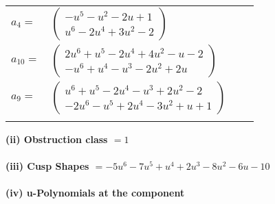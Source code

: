 \documentclass[1p]{elsarticle_modified}
\theoremstyle{definition}
\begin{document}
\begin{tabular}{m{7pt} m{180pt} m{7pt} m{180pt} }
\flushright $a_{4}=$&$\begin{pmatrix}- u^5- u^2-2 u+1\\u^6-2 u^4+3 u^2-2\end{pmatrix}$ \\
\flushright $a_{10}=$&$\begin{pmatrix}2 u^6+u^5-2 u^4+4 u^2- u-2\\- u^6+u^4- u^3-2 u^2+2 u\end{pmatrix}$ \\
\flushright $a_{9}=$&$\begin{pmatrix}u^6+u^5-2 u^4- u^3+2 u^2-2\\-2 u^6- u^5+2 u^4-3 u^2+u+1\end{pmatrix}$\\&\end{tabular}
\flushleft \textbf{(ii) Obstruction class $= 1$}\\~\\
\flushleft \textbf{(iii) Cusp Shapes $= -5 u^6-7 u^5+u^4+2 u^3-8 u^2-6 u-10$}\\~\\
\newpage\renewcommand{\arraystretch}{1}
\flushleft \textbf{(iv) u-Polynomials at the component}\newline \\
\end{document}
